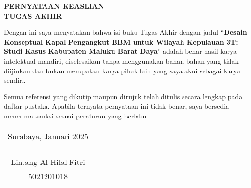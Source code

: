 \begin{center}
  \large
  \textbf{PERNYATAAN KEASLIAN\\TUGAS AKHIR}
\end{center}

\thispagestyle{empty}
\vspace{2ex}

Dengan ini saya menyatakan bahwa isi buku Tugas Akhir dengan judul
``\textbf{Desain Konseptual Kapal Pengangkut BBM untuk Wilayah Kepulauan 3T: Studi Kasus Kabupaten Maluku Barat Daya}''
adalah benar hasil karya intelektual mandiri, diselesaikan tanpa menggunakan bahan-bahan yang tidak diijinkan dan bukan merupakan karya pihak lain yang saya akui sebagai karya sendiri.

Semua referensi yang dikutip maupun dirujuk telah ditulis secara lengkap pada daftar pustaka.
Apabila ternyata pernyataan ini tidak benar, saya bersedia menerima sanksi sesuai peraturan yang berlaku.

\vspace{4ex}

\begin{flushright}
  \begin{tabular}[b]{c}
    Surabaya, Januari 2025\\
    \\
    \\
    \\
    \\
    Lintang Al Hilal Fitri\\
    5021201018
  \end{tabular}
\end{flushright}
